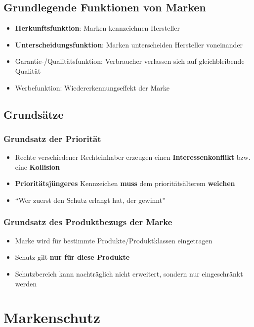 \documentclass[12pt,A4]{extarticle}
\newcommand{\highlight}[1]{\textcolor{highlightColor}{\textbf{#1}}}
\begin{document}
\subsection{Grundlegende Funktionen von Marken}
\begin{itemize}
  \item{\highlight{Herkunftsfunktion}: Marken kennzeichnen Hersteller}
  \item{\highlight{Unterscheidungsfunktion}: Marken unterscheiden Hersteller voneinander}
  \item{Garantie-/Qualitätsfunktion: Verbraucher verlassen sich auf gleichbleibende Qualität}
  \item{Werbefunktion: Wiedererkennungseffekt der Marke}
\end{itemize}

\subsection{Grundsätze}
\subsubsection{Grundsatz der \highlight{Priorität}}
\begin{itemize}
  \item{Rechte verschiedener Rechteinhaber erzeugen einen \textbf{Interessenkonflikt} bzw. eine \textbf{Kollision}}
  \item{\textbf{Prioritätsjüngeres} Kennzeichen \textbf{muss} dem prioritätsälterem \textbf{weichen}}
  \item{``Wer zuerst den Schutz erlangt hat, der gewinnt''}
\end{itemize}

\subsubsection{Grundsatz des \highlight{Produktbezugs} der Marke}\label{sec:Produktbezug}
\begin{itemize}
  \item{Marke wird für bestimmte Produkte/Produktklassen eingetragen}
  \item{Schutz gilt \textbf{nur für diese Produkte}}
  \item{Schutzbereich kann nachträglich nicht erweitert, sondern nur eingeschränkt werden}
\end{itemize}

\section{Markenschutz}
\end{document}
